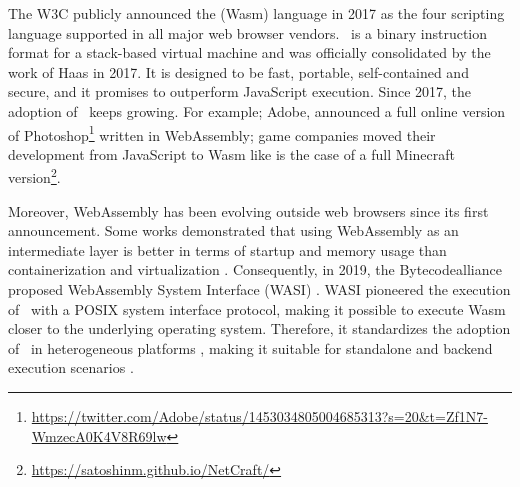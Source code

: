 \msection{\Wasm}


The W3C publicly announced the \Wasm(Wasm) language in 2017 as the four scripting language supported in all major web browser vendors.
\wasm\ is a binary instruction format for a stack-based virtual machine and was officially consolidated by the work of Haas \etal \cite{Haas_2017} in 2017. 
It is designed to be fast, portable, self-contained and secure, and it promises to outperform JavaScript execution. 
Since 2017, the adoption of \wasm\ keeps growing. 
For example; Adobe, announced a full online version of Photoshop\footnote{\url{https://twitter.com/Adobe/status/1453034805004685313?s=20&t=Zf1N7-WmzecA0K4V8R69lw}} written in WebAssembly;  game companies moved their development from JavaScript to Wasm like is the case of a full Minecraft version\footnote{\url{https://satoshinm.github.io/NetCraft/}}. 

Moreover, WebAssembly has been evolving outside web browsers since its first announcement.
Some works demonstrated that using WebAssembly as an intermediate layer is better in terms of startup and memory usage than containerization and virtualization \cite{pMendkiServerless, 1244493Jacobsson}. 
Consequently, in 2019, the Bytecodealliance proposed WebAssembly System Interface (WASI) \cite{WASI}. 
WASI pioneered the execution of \wasm\ with a POSIX system interface protocol, making it possible to execute Wasm closer to the underlying operating system. 
Therefore, it standardizes the adoption of \wasm\ in heterogeneous platforms \cite{bryant2020webassembly}, making it suitable for standalone and backend execution scenarios \cite{9640153, wen2020wasmachine}.

